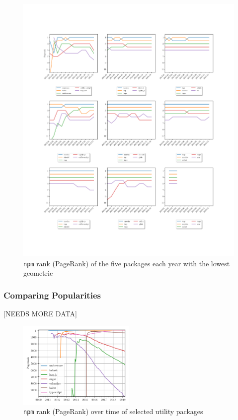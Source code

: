 \documentclass[10pt,conference]{IEEEtran}
\def\code#1{\texttt{#1}}
\begin{document}
  \begin{figure}
    \includegraphics[width=1\textwidth]{figures/highest_ranked.pdf}
    \caption{\code{npm} rank (PageRank) of the five packages each year with the lowest geometric}
    \label{ranksByYear}
  \end{figure}

  \subsubsection{Comparing Popularities}
  [NEEDS MORE DATA]

  \begin{figure}
    \includegraphics[width=0.5\textwidth]{figures/select_packages.png}
    \caption{\code{npm} rank (PageRank) over time of selected utility packages}
    \label{selectPackages}
  \end{figure}
\end{document}
